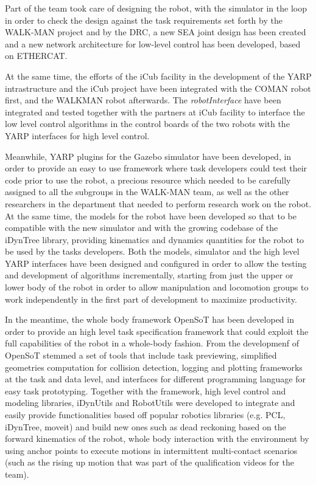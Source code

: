 \documentclass[%
	paper=A4,					%
	twoside=true,				%
	openright,			.
	parskip=full,				%
	chapterprefix=true,			%
	11pt,						%
	headings=normal,			%
	bibliography=totoc,			%
	listof=totoc,				%
	titlepage=on,				%
	captions=tableabove,		%
	draft=false,				%
]{scrreprt}%
\begin{document}
Part of the team took care of designing the robot, with the simulator in the loop in order to check the design against the task requirements set forth by the WALK-MAN project and by the DRC, a new SEA joint design has been created and a new network architecture for low-level control has been developed, based on ETHERCAT. 

At the same time, the efforts of the iCub facility in the development of the YARP intrastructure and the iCub project have been integrated with the COMAN robot first, and the WALKMAN robot afterwards. The \emph{robotInterface} have been integrated and tested together with the partners at iCub facility to interface the low level control algorithms in the control boards of the two robots with the YARP interfaces for high level control. 

Meanwhile, YARP plugins for the Gazebo simulator have been developed, in order to provide an easy to use framework where task developers could test their code prior to use the robot, a precious resource which needed to be carefully assigned to all the subgroups in the WALK-MAN team, as well as the other researchers in the department that needed to perform research work on the robot. At the same time, the models for the robot have been developed so that to be compatible with the new simulator and with the growing codebase of the iDynTree library, providing kinematics and dynamics quantities for the robot to be used by the tasks developers. Both the models, simulator and the high level YARP interfaces have been designed and configured in order to allow the testing and development of algorithms incrementally, starting from just the upper or lower body of the robot in order to allow manipulation and locomotion groups to work independently in the first part of development to maximize productivity. 

In the meantime, the whole body framework OpenSoT has been developed in order to provide an high level task specification framework that could exploit the full capabilities of the robot in a whole-body fashion. From the developmenf of OpenSoT stemmed a set of tools that include task previewing, simplified geometries computation for collision detection, logging and plotting frameworks at the task and data level, and interfaces for different programming language for easy task prototyping. Together with the framework, high level control and modeling libraries, iDynUtils and RobotUtils were developed to integrate and easily provide functionalities based off popular robotics libraries (e.g. PCL, iDynTree, moveit) and build new ones such as dead reckoning based on the forward kinematics of the robot, whole body interaction with the environment by using anchor points to execute motions in intermittent multi-contact scenarios (such as the rising up motion that was part of the qualification videos for the team). 
\end{document}
